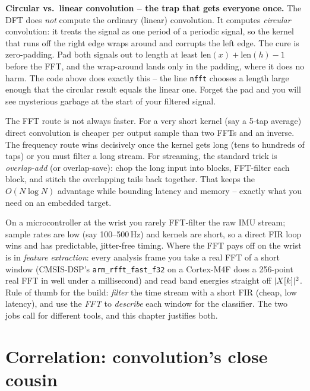 \begin{trapbox}
\textbf{Circular vs.\ linear convolution -- the trap that gets everyone once.}
The DFT does \emph{not} compute the ordinary (linear) convolution. It computes
\emph{circular} convolution: it treats the signal as one period of a periodic
signal, so the kernel that runs off the right edge wraps around and corrupts the
left edge. The cure is zero-padding. Pad both signals out to length at least
$\text{len}(x) + \text{len}(h) - 1$ before the FFT, and the wrap-around lands
only in the padding, where it does no harm. The code above does exactly this --
the line \texttt{nfft} chooses a length large enough that the circular result
equals the linear one. Forget the pad and you will see mysterious garbage at the
start of your filtered signal.
\end{trapbox}

\begin{intuitionbox}
The FFT route is not always faster. For a very short
kernel (say a 5-tap average) direct convolution is cheaper per output sample than
two FFTs and an inverse. The frequency route wins decisively once the kernel
gets long (tens to hundreds of taps) or you must filter a long stream. For
streaming, the standard trick is \emph{overlap-add} (or overlap-save): chop the
long input into blocks, FFT-filter each block, and stitch the overlapping tails
back together. That keeps the $O(N\log N)$ advantage while bounding latency and
memory -- exactly what you need on an embedded target.
\end{intuitionbox}

\begin{buildbox}
On a microcontroller at the wrist you rarely FFT-filter the raw IMU stream;
sample rates are low (say 100--500\,Hz) and kernels are short, so a direct FIR
loop wins and has predictable, jitter-free timing. Where the FFT pays off on the wrist
is in \emph{feature extraction}: every analysis frame you take a
real FFT of a short window (CMSIS-DSP's \texttt{arm\_rfft\_fast\_f32} on a
Cortex-M4F does a 256-point real FFT in well under a millisecond) and read band
energies straight off $\lvert X[k]\rvert^2$. Rule of thumb for the build: \emph{filter}
the time stream with a short FIR (cheap, low latency), and use the \emph{FFT} to
\emph{describe} each window for the classifier. The two jobs call for
different tools, and this chapter justifies both.
\end{buildbox}

\section{Correlation: convolution's close cousin}
\label{ch11:correlation}


